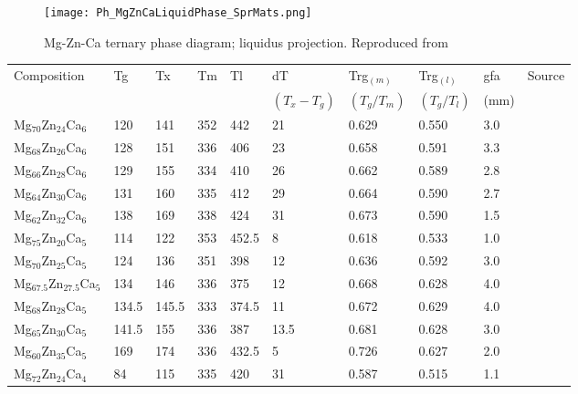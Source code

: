 \documentclass[a4paper,12pt,oneside]{report}%
\begin{document}
\begin{figure}[htb]
	\centering
	\texttt{[image: Ph\_MgZnCaLiquidPhase\_SprMats.png]}
	\caption[Mg-Zn-Ca ternary phase diagram; liquidus projection.]{Mg-Zn-Ca ternary phase diagram; liquidus projection. Reproduced from \cite{Paris1933}}
	\label{fig:MgZnCaLiquidPhaseD}
\end{figure}

\begin{table}[h]
	\centering
	\begin{tabular}{ l l l l l l l l l l }
		\toprule
		Composition & \acrshort{Tg} & \acrshort{Tx} & \acrshort{Tm} & \acrshort{Tl} & \acrshort{dT} & \acrshort{Trg}$_{(m)}$ & \acrshort{Trg}$_{(l)}$ & \acrshort{gfa} & Source \\ 
		& & & & & $(T_{x} - T_{g})$ & $(T_{g}/T_{m})$ & $(T_{g}/T_{l})$ & (mm) & \\ 
		\midrule
		Mg$_{70}$Zn$_{24}$Ca$_{6}$ & 120 & 141 & 352 & 442 & 21 & 0.629 & 0.550 & 3.0 & \cite{Cao2013, Cao2012} \\ 
		Mg$_{68}$Zn$_{26}$Ca$_{6}$ & 128 & 151 & 336 & 406 & 23 & 0.658 & 0.591 & 3.3 & \cite{Cao2013, Cao2012} \\ 
		Mg$_{66}$Zn$_{28}$Ca$_{6}$ & 129 & 155 & 334 & 410 & 26 & 0.662 & 0.589 & 2.8 & \cite{Cao2013, Cao2012} \\ 
		Mg$_{64}$Zn$_{30}$Ca$_{6}$ & 131 & 160 & 335 & 412 & 29 & 0.664 & 0.590 & 2.7 & \cite{Cao2013, Cao2012} \\ 
		Mg$_{62}$Zn$_{32}$Ca$_{6}$ & 138 & 169 & 338 & 424 & 31 & 0.673 & 0.590 & 1.5 & \cite{Cao2013, Cao2012} \\ 
		Mg$_{75}$Zn$_{20}$Ca$_{5}$ & 114 & 122 & 353 & 452.5 & 8 & 0.618 & 0.533 & 1.0 & \cite{Gu2005} \\ 
		Mg$_{70}$Zn$_{25}$Ca$_{5}$ & 124 & 136 & 351 & 398 & 12 & 0.636 & 0.592 & 3.0 & \cite{Gu2005, Zhou2013} \\ 
		Mg$_{67.5}$Zn$_{27.5}$Ca$_{5}$ & 134 & 146 & 336 & 375 & 12 & 0.668 & 0.628 & 4.0 & \cite{Gu2005} \\ 
		Mg$_{68}$Zn$_{28}$Ca$_{5}$ & 134.5 & 145.5 & 333 & 374.5 & 11 & 0.672 & 0.629 & 4.0 & \cite{Gu2005} \\ 
		Mg$_{65}$Zn$_{30}$Ca$_{5}$ & 141.5 & 155 & 336 & 387 & 13.5 & 0.681 & 0.628 & 3.0 & \cite{Gu2005} \\ 
		Mg$_{60}$Zn$_{35}$Ca$_{5}$ & 169 & 174 & 336 & 432.5 & 5 & 0.726 & 0.627 & 2.0 & \cite{Gu2005} \\ 
		Mg$_{72}$Zn$_{24}$Ca$_{4}$ & 84 & 115 & 335 & 420 & 31 & 0.587 & 0.515 & 1.1 & \cite{Cao2013, Cao2012} \\ 

\end{tabular}
\end{table}
\end{document}
